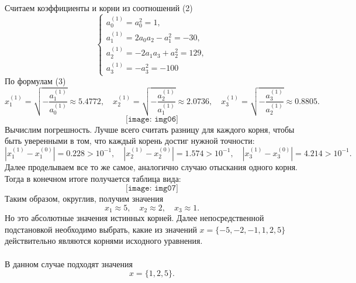 \documentclass[a4paper, 12pt]{article}
\begin{document}
\begin{enumerate}
		 Считаем коэффициенты и корни из соотношений (2) $$\begin{cases}
		 	a_0^{(1)} = a_0^2 = 1,\\
		 	a_1^{(1)} =2a_0a_2 - a_1^2 = -30,\\
		 	a_2^{(1)} = - 2a_1a_3 + a_2^2 = 129,\\
		 	a_3^{(1)} = -a_3^2 = -100
		 \end{cases}$$
		 По формулам (3)
		 $$x_1^{(1)} = \sqrt{- \dfrac{a_1^{(1)}}{a_0^{(1)}}} \approx 5.4772,\quad x_2^{(1)} = \sqrt{- \dfrac{a_2^{(1)}}{a_1^{(1)}}} \approx 2.0736,\quad x_3^{(1)} = \sqrt{- \dfrac{a_3^{(1)}}{a_2^{(1)}}} \approx 0.8805.$$
		 $$
		 \texttt{[image: img06]}
		 $$
		 Вычислим погрешность. Лучше всего считать разницу для каждого корня, чтобы быть уверенными в том, что каждый корень достиг нужной точности:
		 $$|x_1^{(1)} - x_1^{(0)}| = 0.228 > 10^{-1},\quad|x_2^{(1)} - x_2^{(0)}| = 1.574 > 10^{-1},\quad |x_3^{(1)} - x_3^{(0)}| = 4.214 > 10^{-1}.$$
		 Далее проделываем все то же самое, аналогично случаю отыскания одного корня. Тогда в конечном итоге получается таблица вида:
		 $$
		 \texttt{[image: img07]}
		 $$
		 Таким образом, округлив, получим значения $$x_1 \approx 5,\quad x_2 \approx 2,\quad x_3 \approx 1.$$
		 Но это абсолютные значения истинных корней. Далее непосредственной подстановкой необходимо выбрать, какие из значений $x=\{-5, -2, -1, 1, 2, 5\}$ действительно являются корнями исходного уравнения.\\\\
		 В данном случае подходят значения $$x=\{1,2,5\}.$$
	\end{enumerate}
	
\end{document}
